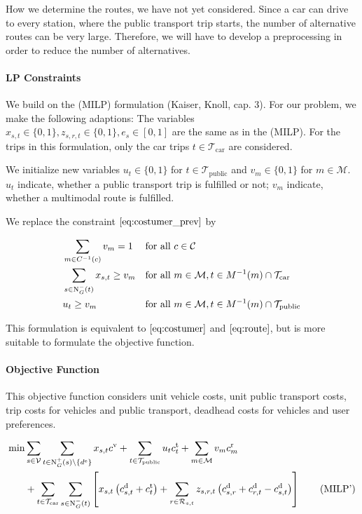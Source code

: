 How we determine the routes, we have not yet considered. Since a car can drive to every station, where the public transport trip starts, the number of alternative routes can be very large. Therefore, we will have to develop a preprocessing in order to reduce the number of alternatives.

\paragraph{LP Constraints} \parfill

We build on the (MILP) formulation (Kaiser, Knoll, cap. 3). For our problem, we make the following adaptions: The variables $x_{s,t}\in \{0,1\}, z_{s,r,t}\in \{0,1\}, e_s \in[0,1]$ are the same as in the (MILP). For the trips in this formulation, only the car trips $t\in\mathcal{T}_{\operatorname{car}}$ are considered.

We initialize new variables $u_t \in\{0,1\}$ for $t\in\mathcal{T}_{\operatorname{public}}$ and $v_m \in\{0,1\}$ for $m\in\mathcal{M}$. $u_t$ indicate, whether a public transport trip is fulfilled or not; $v_m$ indicate, whether a multimodal route is fulfilled. 

We replace the constraint $\eqref{eq:costumer_prev}$ by

\begin{align}
	& \sum_{m\in C^{-1}(c)} v_m = 1 & & \text{for all } c\in\mathcal{C} \label{eq:costumer_new} \\
	& \sum_{s\in\operatorname{N}_G^-(t)} x_{s,t} \geq v_m & & \text{for all } m\in\mathcal{M}, t\in M^{-1}(m)\cap\mathcal{T}_{\operatorname{car}} \label{eq:route_car} \\
	& u_t \geq v_m & & \text{for all } m\in\mathcal{M}, t\in M^{-1}(m)\cap\mathcal{T}_{\operatorname{public}} \label{eq:route_public}
\end{align}

This formulation is equivalent to $\eqref{eq:costumer}$ and $\eqref{eq:route}$, but is more suitable to formulate the objective function.

\paragraph{Objective Function} \parfill

This objective function considers unit vehicle costs, unit public transport costs, trip costs for vehicles and public transport, deadhead costs for vehicles and user preferences.

\begin{align}
	\min & \sum_{s\in\mathcal{V}} \sum_{t\in\operatorname{N}_G^+(s)\backslash\{d^{\operatorname{e}}\}} x_{s,t}c^{\operatorname{v}} + \sum_{t\in\mathcal{T}_{\operatorname{public}}} u_t c^{\operatorname{t}}_t + \sum_{m\in\mathcal{M}} v_m c^{\operatorname{r}}_m \nonumber \\
	& + \sum_{t\in\mathcal{T}_{\operatorname{car}}} \sum_{s\in\operatorname{N}_G^-(t)} \left[x_{s,t}\left(c^{\operatorname{d}}_{s,t}+c^{\operatorname{t}}_{t}\right) + \sum_{r\in\mathcal{R}_{s,t}} z_{s,r,t}\left(c^{\operatorname{d}}_{s,r}+c^{\operatorname{d}}_{r,t}-c^{\operatorname{d}}_{s,t}\right)\right] \tag{MILP'} \label{eq:MILP_new}
\end{align}